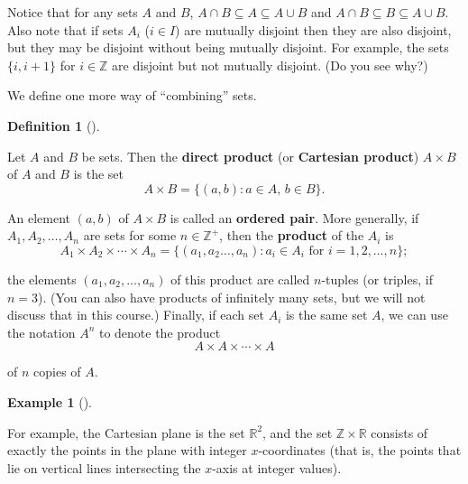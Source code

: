\documentclass[10pt,]{book}
\newcommand{\terminology}[1]{\textbf{#1}}
\theoremstyle{plain}
\theoremstyle{definition}
\newtheorem{definition}[theorem]{Definition}
\theoremstyle{definition}
\theoremstyle{definition}
\newtheorem{example}[theorem]{Example}
\theoremstyle{definition}
\numberwithin{equation}{section}
\def\Z{\mathbb{Z}}
\def\R{\mathbb{R}}
\begin{document}
    Notice that for any sets \(A\) and \(B\), \(A\cap B \subseteq A \subseteq A\cup B\) and
    \(A\cap B \subseteq B \subseteq A\cup B\). Also note that if sets \(A_i\) (\(i \in I\)) are mutually disjoint then they are also disjoint, but they may be disjoint without being mutually disjoint. For example, the sets \(\{i, i+1\}\) for \(i\in \Z\) are disjoint but not mutually disjoint. (Do you see why?)
\par

    We define one more way of ``combining'' sets.
\begin{definition}[{}]\label{definition-7}

        Let \(A\) and \(B\) be sets. Then the \terminology{direct product} (or \terminology{Cartesian 
        product}) \(A\times B\) of \(A\) and \(B\) is the set
\begin{equation*}

          A\times B =
          \{(a,b): \text{\(a\in A\), \(b\in B\)} \}.
        
\end{equation*}

\par

        An element \((a,b)\) of
        \(A\times B\) is called an \terminology{ordered pair}. More generally, if
        \(A_1, A_2, \ldots, A_n\) are sets for some \(n\in \Z^+\), then the
        \terminology{product} of the \(A_i\) is
\begin{equation*}

          A_1\times A_2 \times \cdots
          \times A_n=\{(a_1, a_2 \ldots, a_n): a_i \in A_i \text{ for
          } i=1,2, \ldots, n\}; 
        
\end{equation*}

        the elements \((a_1,a_2,\ldots,a_n)\) of this
        product are called \(n\)-tuples (or triples, if \(n=3\)). (You can also have products of infinitely many sets, but we will
        not discuss that in this course.) Finally, if each set \(A_i\) is
        the same set \(A\), we can use the notation \(A^n\) to denote the
        product
\begin{equation*}

          A\times A \times \cdots \times A
        
\end{equation*}

        of \(n\) copies of
        \(A\).
\label{notation-22}
\end{definition}
\begin{example}[]\label{example-4}

        For example, the Cartesian plane is the set \(\R^2\), and the set \(\Z \times \R\) consists of exactly the points in the plane with integer \(x\)-coordinates
        (that is, the points that lie on vertical lines intersecting the \(x\)-axis at integer values).
\end{example}
\typeout{************************************************}
\typeout{************************************************}
\end{document}
